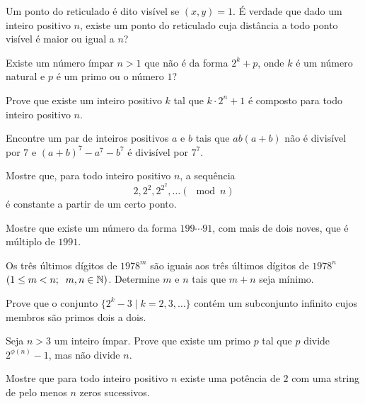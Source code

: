 \documentclass[10pt,a4paper]{article}
\begin{document}
	\begin{prob}
		Um ponto do reticulado é dito visível se $(x, y)=1$. É verdade que dado um inteiro positivo $n$, existe um ponto do reticulado cuja distância a todo ponto visível é maior ou igual a $n$?
	\end{prob}

	\begin{prob}
		Existe um número ímpar $n>1$ que não é da forma $2^k+p$, onde $k$ é um número natural e $p$ é um primo ou o número $1$?
	\end{prob}

	\begin{prob}
		Prove que existe um inteiro positivo $k$ tal que $k\cdot2^n+1$ é composto para todo inteiro positivo $n$.
	\end{prob}

	\begin{prob}[IMO]
		Encontre um par de inteiros positivos $a$ e $b$ tais que $ab(a+b)$ não é divisível por $7$ e $(a+b)^7-a^7-b^7$ é divisível por $7^7$.
	\end{prob}

	\begin{prob}
		Mostre que, para todo inteiro positivo $n$, a sequência $$2,2^2,2^{2^2},\dots (\mod n)$$ é constante a partir de um certo ponto.
	\end{prob}

	\begin{prob}[OBM]
		Mostre que existe um número da forma $199 \cdots 91$, com mais de dois noves, que é múltiplo de $1991$.
	\end{prob}

	\begin{prob}
		Os três últimos dígitos de $1978^m$ são iguais aos três últimos dígitos de $1978^n$ $(1 \leq m <n; \mbox{\;\;}m,n \in \mathbb{N})$. Determine $m$ e $n$ tais que $m+n$ seja mínimo.
	\end{prob}

	\begin{prob}
		Prove que o conjunto $\{2^k-3\mid k=2, 3,\ldots\}$ contém um subconjunto infinito cujos membros são primos dois a dois.
	\end{prob}

	\begin{prob}
		Seja $n>3$ um inteiro ímpar. Prove que existe um primo $p$ tal que $p$ divide $2^{\phi(n)}-1$, mas não divide $n$.
	\end{prob}

	\begin{prob}
		Mostre que para todo inteiro positivo $n$ existe uma potência de $2$ com uma string de pelo menos $n$ zeros sucessivos.
	\end{prob}
\end{document}
